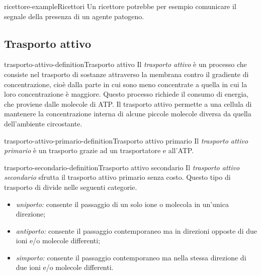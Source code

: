 \documentclass[preview]{standalone}
\begin{document}
\begin{snippetexample}{ricettore-example}{Ricettori}
    Un ricettore potrebbe per esempio comunicare il segnale della presenza di un agente patogeno.
\end{snippetexample}

\subsection{Trasporto attivo}

\begin{snippetdefinition}{trasporto-attivo-definition}{Trasporto attivo}
    Il \textit{trasporto attivo} è un processo che consiste nel trasporto di sostanze attraverso la membrana contro il gradiente
    di concentrazione, cioè dalla parte in cui sono meno concentrate a quella in cui la loro
    concentrazione è maggiore. Questo processo richiede il consumo di energia, che proviene
    dalle molecole di ATP. Il trasporto attivo permette a una cellula di mantenere la
    concentrazione interna di alcune piccole molecole diversa da quella dell'ambiente
    circostante.
\end{snippetdefinition}


\begin{snippetdefinition}{trasporto-attivo-primario-definition}{Trasporto attivo primario}
    Il \textit{trasporto attivo primario} è un trasporto grazie ad un trasportatore e all'ATP.
\end{snippetdefinition}

\begin{snippetdefinition}{trasporto-secondario-definition}{Trasporto attivo secondario}
    Il \textit{trasporto attivo secondario} sfrutta il trasporto attivo primario
    senza costo.
    Questo tipo di trasporto di divide nelle seguenti categorie.
    \begin{itemize}
        \item \textit{uniporto:} consente il passaggio di un solo ione o molecola in un'unica direzione;
        \item \textit{antiporto:} consente il passaggio contemporaneo ma in direzioni opposte di due ioni e/o molecole differenti;
        \item \textit{simporto:} consente il passaggio contemporaneo ma nella stessa direzione di due ioni e/o molecole differenti.
    \end{itemize}
\end{snippetdefinition}
\end{document}

